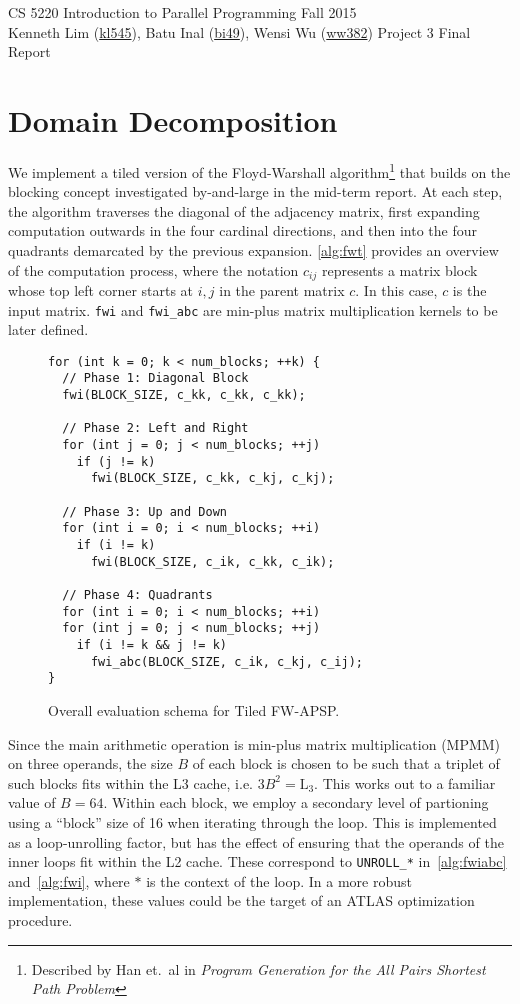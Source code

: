 \documentclass{scrartcl}
\begin{document}
  \begin{framed}
  CS 5220 Introduction to Parallel Programming \hfill Fall 2015 \\
  Kenneth Lim (\href{mailto:kl545@cornell.edu}{kl545}), Batu Inal (\href{mailto:bi49@cornell.edu}{bi49}), Wensi Wu (\href{mailto:ww382@cornell.edu}{ww382}) \hfill Project 3 Final Report\hspace{-3ex}
  \end{framed}
  \section{Domain Decomposition}
  We implement a tiled version of the Floyd-Warshall algorithm\footnote{Described by Han et.~al in \emph{Program Generation for the All Pairs Shortest Path Problem}} that builds on the blocking concept investigated by-and-large in the mid-term report. At each step, the algorithm traverses the diagonal of the adjacency matrix, first expanding computation outwards in the four cardinal directions, and then into the four quadrants demarcated by the previous expansion. \autoref{alg:fwt} provides an overview of the computation process, where the notation $c_{ij}$ represents a matrix block whose top left corner starts at $i, j$ in the parent matrix $c$. In this case, $c$ is the input matrix. \texttt{fwi} and \texttt{fwi\_abc} are min-plus matrix multiplication kernels to be later defined.

  \begin{figure}[ht!]
    \begin{lstlisting}
for (int k = 0; k < num_blocks; ++k) {
  // Phase 1: Diagonal Block
  fwi(BLOCK_SIZE, c_kk, c_kk, c_kk);

  // Phase 2: Left and Right
  for (int j = 0; j < num_blocks; ++j)
    if (j != k)
      fwi(BLOCK_SIZE, c_kk, c_kj, c_kj);

  // Phase 3: Up and Down
  for (int i = 0; i < num_blocks; ++i)
    if (i != k)
      fwi(BLOCK_SIZE, c_ik, c_kk, c_ik);

  // Phase 4: Quadrants
  for (int i = 0; i < num_blocks; ++i)
  for (int j = 0; j < num_blocks; ++j)
    if (i != k && j != k)
      fwi_abc(BLOCK_SIZE, c_ik, c_kj, c_ij);
}
    \end{lstlisting}
    \caption{Overall evaluation schema for Tiled FW-APSP.\label{alg:fwt}}
  \end{figure}

  Since the main arithmetic operation is min-plus matrix multiplication (MPMM) on three operands, the size $B$ of each block is chosen to be such that a triplet of such blocks fits within the L3 cache, i.e. $3B^2 = \textrm{L}_3$. This works out to a familiar value of $B = 64$. Within each block, we employ a secondary level of partioning using a ``block'' size of 16 when iterating through the loop. This is implemented as a loop-unrolling factor, but has the effect of ensuring that the operands of the inner loops fit within the L2 cache. These correspond to \texttt{UNROLL\_*} in~\autoref{alg:fwiabc} and~\autoref{alg:fwi}, where $*$ is the context of the loop. In a more robust implementation, these values could be the target of an ATLAS optimization procedure.
\end{document}
